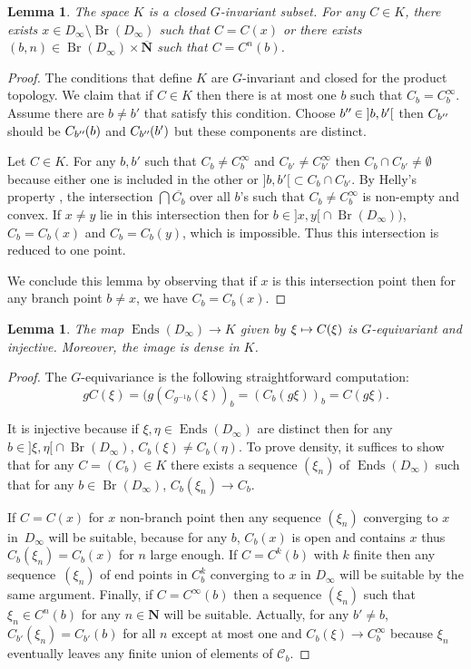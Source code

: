 \documentclass[JEP,XML,SOM,Unicode,NoFloatCountersInSection]{cedram}
\newcommand\mto{\mathchoice{\longmapsto}{\mapsto}{\mapsto}{\mapsto}}
\let\mathcal\mathscr
\theoremstyle{plain}
\newtheorem{lem}[thm]{Lemma}
\theoremstyle{definition}
\newcommand*{\mydprime}{^{\prime\prime}\mkern-1.2mu}
\newcommand{\NN}{\mathbf{N}}
\newcommand{\cC}{\mathcal{C}}
\DeclareMathOperator{\Ends}{Ends}
\DeclareMathOperator{\Br}{Br}
\begin{document}
\begin{lem}\label{lem:orbits} The space $K$ is a closed $G$-invariant subset. For any $C\in K$, there exists $x\in D_\infty\setminus\Br(D_\infty)$ such that $C=C(x)$ or there exists $(b,n)\in \Br(D_\infty)\times\overline{\NN}$ such that $C=C^n(b)$.
\end{lem}

\begin{proof} The conditions that define $K$ are $G$-invariant and closed for the product topology.
We claim that if $C\in K$ then there is at most one $b$ such that $C_b=C^\infty_b$. Assume there are $b\neq b'$ that satisfy this condition. Choose $b\mydprime\in{}]b,b'[$ then $C_{b\mydprime}$ should be $C_{b\mydprime}(b)$ and $C_{b\mydprime}(b')$ but these components are distinct.

Let $C\in K$. For any $b,b'$ such that $C_b\neq C_b^\infty$ and $C_{b'}\neq C_{b'}^\infty$ then $C_b\cap C_{b'}\neq\emptyset$ because either one is included in the other or $]b,b'[{}\subset C_b\cap C_{b'}$. By Helly's property \cite[Lem.\,2.1]{DM_dendrites}, the intersection $\bigcap \overline{C_b}$ over all $b$'s such that $C_b\neq C_b^\infty$ is non-empty and convex. If $x\neq y$ lie in this intersection then for $b\in{}]x,y[{}\cap\Br(D_\infty))$, $C_b=C_b(x)$ and $C_b=C_b(y)$, which is impossible. Thus this intersection is reduced to one point.

We conclude this lemma by observing that if $x$ is this intersection point then for any branch point $b\neq x$, we have $C_b=C_b(x)$.
\end{proof}

\begin{lem} The map $\Ends(D_\infty)\to K$ given by $\xi\mto C(\xi)$ is $G$-equivariant and injective. Moreover, the image is dense in $K$.
\end{lem}

\begin{proof} The $G$-equivariance is the following straightforward computation:
\[
gC(\xi)=(g(C_{g^{-1}b}(\xi))_b=(C_{b}(g\xi))_b=C(g\xi).
\]

It is injective because if $\xi,\eta\!\in\!\Ends(D_\infty)$ are distinct then for any \hbox{$b\!\in\!{}]\xi,\eta[{}\!\cap\!\Br(D_\infty)$}, $C_b(\xi)\neq C_b(\eta)$. To prove density, it suffices to show that for any $C=(C_b)\in K$ there exists a sequence $(\xi_n)$ of $\Ends(D_\infty)$ such that for any $b\in \Br(D_\infty)$, $C_b(\xi_n)\to C_b$.

If $C=C(x)$ for $x$ non-branch point then any sequence $(\xi_n)$ converging to $x$ in~$D_\infty$ will be suitable, because for any $b$, $C_b(x)$ is open and contains $x$ thus $C_b(\xi_n)=C_b(x)$ for $n$ large enough. If $C=C^k(b)$ with $k$ finite then any sequence~$(\xi_n)$ of end points in $C_b^k$ converging to $x$ in $D_\infty$ will be suitable by the same argument. Finally, if $C=C^\infty(b)$ then a sequence $(\xi_n)$ such that $\xi_n\in C^n(b)$ for any $n\in\NN$ will be suitable. Actually, for any $b'\neq b$, $C_{b'}(\xi_n)=C_{b'}(b)$ for all $n$ except at most one and $C_b(\xi)\to C_b^\infty$ because $\xi_n$ eventually leaves any finite union of elements of $\cC_b$.
\end{proof}
\end{document}
